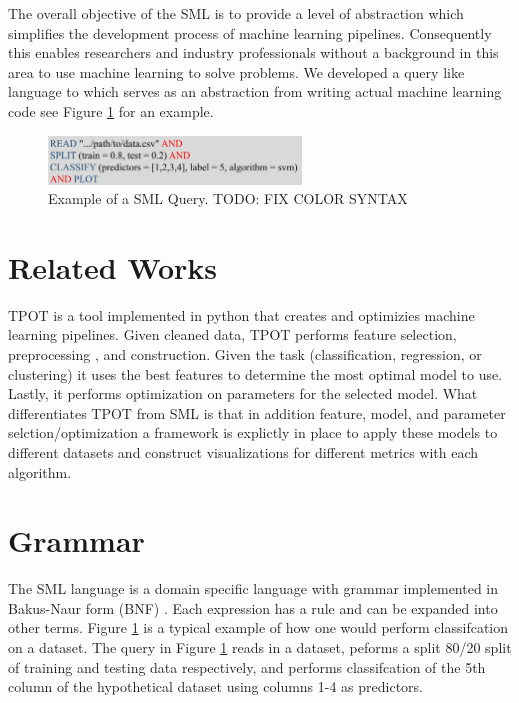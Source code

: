 \documentclass[jair,twoside,11pt,theapa]{article}
\begin{document}
The overall objective of the SML is to provide a level of abstraction which simplifies the development process of machine learning pipelines. Consequently this enables researchers and industry professionals without a background in this area to use machine learning to solve problems. We developed a query like language to which serves as an abstraction from writing actual machine learning code see Figure \ref{fig:sml-ex-1} for an example.   

\begin{figure}
\includegraphics[width=0.6\textwidth]{figs/sml-ex-1.png}
\centering
\caption{Example of a SML Query. TODO: FIX COLOR SYNTAX}
\label{fig:sml-ex-1}
\end{figure}

\section{Related Works}
\label{RelatedWorks}

TPOT \cite{TPOT} is a tool implemented in python that creates and optimizies machine learning pipelines. Given cleaned data, TPOT performs feature selection, preprocessing , and construction. Given the task (classification, regression, or clustering) it uses the best features to determine the most optimal model to use. Lastly, it performs optimization on parameters for the selected model. What differentiates TPOT from SML is that in addition feature, model, and parameter selction/optimization a framework is explictly in place to apply these models to different datasets and construct visualizations for different metrics with each algorithm.

\section{Grammar}
\label{grammar}

The SML language is a domain specific language with grammar implemented in Bakus-Naur form (BNF) \cite{BNF}. Each expression has a rule and can be expanded into other terms. Figure \ref{fig:sml-ex-1} is a typical example of how one would perform classifcation on a dataset. The query in Figure \ref{fig:sml-ex-1} reads in a dataset, peforms a split 80/20 split of training and testing data respectively, and performs classifcation of the 5th column of the hypothetical dataset using columns 1-4 as predictors. 
\end{document}

